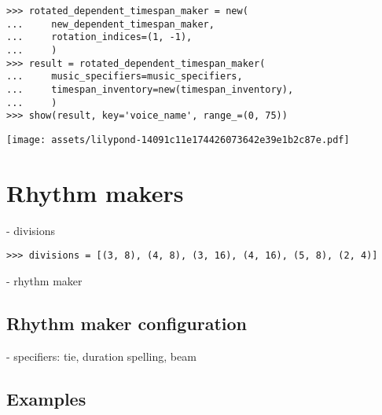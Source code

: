 \begin{singlespacing}
\vspace{-0.5\baselineskip}
\begin{lstlisting}
>>> rotated_dependent_timespan_maker = new(
...     new_dependent_timespan_maker,
...     rotation_indices=(1, -1),
...     )
>>> result = rotated_dependent_timespan_maker(
...     music_specifiers=music_specifiers,
...     timespan_inventory=new(timespan_inventory),
...     )
>>> show(result, key='voice_name', range_=(0, 75))
\end{lstlisting}
\noindent\texttt{[image: assets/lilypond-14091c11e174426073642e39e1b2c87e.pdf]}
\end{singlespacing}

\section{Rhythm makers}

- divisions

\begin{comment}
<abjad>
divisions = [(3, 8), (4, 8), (3, 16), (4, 16), (5, 8), (2, 4)]
</abjad>
\end{comment}

\begin{singlespacing}
\vspace{-0.5\baselineskip}
\begin{lstlisting}
>>> divisions = [(3, 8), (4, 8), (3, 16), (4, 16), (5, 8), (2, 4)]
\end{lstlisting}
\end{singlespacing}

- rhythm maker

\subsection{Rhythm maker configuration} %

- specifiers: tie, duration spelling, beam

\subsection{Examples} %

